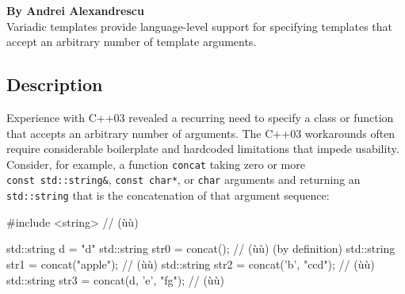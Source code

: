 



\label{variadic-templates}
\setcounter{table}{0}
\setcounter{footnote}{0}
\setcounter{lstlisting}{0}

\noindent\textbf{By Andrei Alexandrescu}\\[.5ex]


Variadic templates provide language-level support for specifying
templates that accept an arbitrary number of template arguments.

\subsection[Description]{Description}\label{description-variadic}

Experience with C++03 revealed a recurring need to specify a class or
function that accepts an arbitrary number of arguments. The C++03
workarounds often require considerable boilerplate and hardcoded
limitations that impede usability. Consider, for example, a function
\lstinline!concat! taking zero or more
\lstinline!const!~\lstinline!std::string&!, \lstinline!const!~\lstinline!char*!, or
\lstinline!char! arguments and returning an \lstinline!std::string! that is
the concatenation of that argument sequence:

\begin{emcppslisting}
#include <string>  // (ù{}ù)

std::string d = "d"
std::string str0 = concat();                // (ù{}ù) (by definition)
std::string str1 = concat("apple");         // (ù{}ù)
std::string str2 = concat('b', "ccd");      // (ù{}ù)
std::string str3 = concat(d, 'e', "fg");    // (ù{}ù)
\end{emcppslisting}
    

